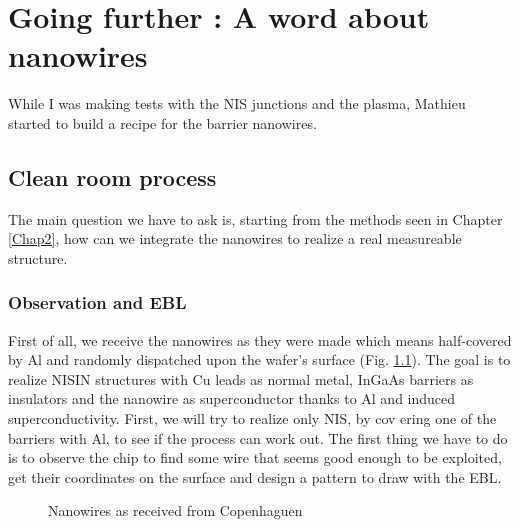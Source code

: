 \chapter{Going further : A word about nanowires}
\label{Chap5}

While I was making tests with the NIS junctions and the plasma, Mathieu started to build a recipe for the barrier nanowires.
       
    \section{Clean room process}
        
        The main question we have to ask is, starting from the methods seen in Chapter \ref{Chap2}, how can we integrate the nanowires to realize a real measureable structure.
                
        \subsection{Observation and EBL}
        
        First of all, we receive the nanowires as they were made which means half-covered by Al and randomly dispatched upon the wafer's surface (Fig. \ref{NWfirst}). The goal is to realize NISIN structures with Cu leads as normal metal, InGaAs barriers as insulators and the nanowire as superconductor thanks to Al and induced superconductivity. First, we will try to realize only NIS, by cov ering one of the barriers with Al, to see if the process can work out. The first thing we have to do is to observe the chip to find some wire that seems good enough to be exploited, get their coordinates on the surface and design a pattern to draw with the EBL.
        
        \begin{figure}
            \centering
            \caption{Nanowires as received from Copenhaguen}
            \label{NWfirst}
        \end{figure}
        
